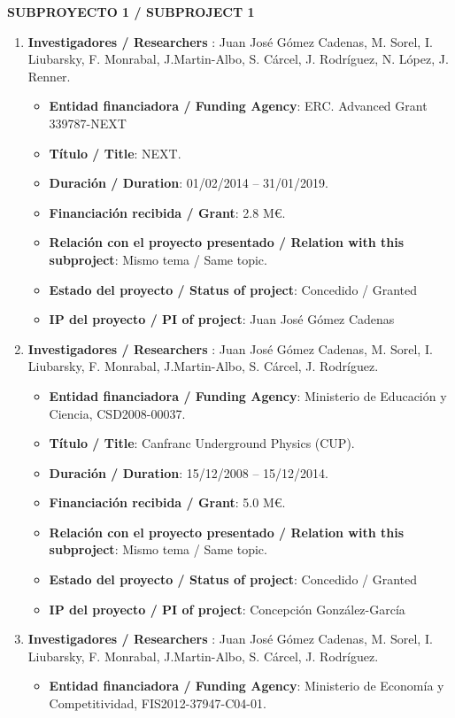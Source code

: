 \noindent\textbf{SUBPROYECTO 1 / SUBPROJECT 1}

\begin{enumerate}
\item {\bf Investigadores / Researchers }: Juan José Gómez Cadenas, M. Sorel, I. Liubarsky, F. Monrabal, J.Martin-Albo, S. Cárcel, J. Rodríguez, N. López, J. Renner.
\begin{itemize}
\item {\bf Entidad financiadora / Funding Agency}: ERC. Advanced Grant 339787-NEXT 
\item {\bf Título / Title}:  NEXT.
\item {\bf Duración / Duration}: 01/02/2014 -- 31/01/2019. 
\item {\bf Financiación recibida / Grant}: 2.8 M\euro. 
\item {\bf Relación con el proyecto presentado / Relation with this subproject}: Mismo tema / Same topic. 
\item {\bf Estado del proyecto / Status of project}: Concedido / Granted
\item {\bf IP del proyecto / PI of project}: Juan José Gómez Cadenas
\end{itemize}
\item {\bf Investigadores / Researchers }: Juan José Gómez Cadenas, M. Sorel, I. Liubarsky, F. Monrabal, J.Martin-Albo, S. Cárcel, J. Rodríguez.
\begin{itemize}
\item {\bf Entidad financiadora / Funding Agency}: Ministerio de Educaci\'on y Ciencia, CSD2008-00037.
\item {\bf Título / Title}:  Canfranc Underground Physics (CUP).
\item {\bf Duración / Duration}: 15/12/2008 -- 15/12/2014. 
\item {\bf Financiación recibida / Grant}: 5.0 M\euro. 
\item {\bf Relación con el proyecto presentado / Relation with this subproject}: Mismo tema / Same topic. 
\item {\bf Estado del proyecto / Status of project}: Concedido / Granted
\item {\bf IP del proyecto / PI of project}: Concepción González-García 
\end{itemize}
\item {\bf Investigadores / Researchers }: Juan José Gómez Cadenas, M. Sorel, I. Liubarsky, F. Monrabal, J.Martin-Albo, S. Cárcel, J. Rodríguez.
\begin{itemize}
\item {\bf Entidad financiadora / Funding Agency}:  Ministerio de Econom\'ia y Competitividad, FIS2012-37947-C04-01.

\end{itemize}
\end{enumerate}
